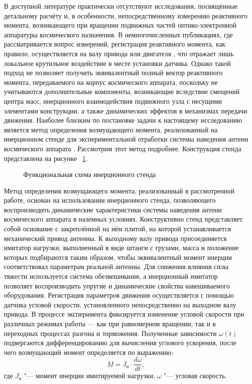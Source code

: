 В доступной литературе практически отсутствуют исследования, посвящённые детальному расчёту и, в особенности, непосредственному измерению реактивного момента, возникающего при вращении подвижных частей оптико-электронной аппаратуры космического назначения. В немногочисленных публикациях, где рассматривается вопрос измерений, регистрация реактивного момента, как правило, осуществляется на валу привода или двигателя \cite{Rayanov2020}, что отражает лишь локальное крутильное воздействие в месте установки датчика. Однако такой подход не позволяет получить эквивалентный полный вектор реактивного момента, передаваемого на корпус космического аппарата, поскольку не учитываются дополнительные компоненты, возникающие вследствие смещений центра масс, инерционного взаимодействия подвижного узла с несущими элементами конструкции, а также динамических эффектов в механизмах передачи движения. Наиболее близким по постановке задачи к настоящему исследованию является метод определения возмущающего момента, реализованный на инерционном стенде для экспериментальной отработки системы наведения антенн космического аппарата \cite{Goncharuk2013}. Рассмотрим этот метод подробнее. Конструкция стенда представлена на рисунке ~\cref{fig:stand}.
\begin{figure}[ht] 
	\caption{Функциональная схема инерционного стенда}
	\label{fig:stand} 
\end{figure}

Метод определения возмущающего момента, реализованный в рассмотренной работе, %
основан на использовании инерционного стенда, позволяющего воспроизводить динамические характеристики системы наведения антенн космического аппарата в наземных условиях. Конструктивно стенд представляет собой основание с закреплённой на нём плитой, на которой устанавливается механический привод антенны. К выходному валу привода присоединяется имитатор нагрузки, выполненный в виде штанги с грузами, масса и положение которых подбираются таким образом, чтобы эквивалентный момент инерции соответствовал параметрам реальной антенны. Для снижения влияния силы тяжести используется система обезвешивания, а инерционный имитатор позволяет воспроизводить упругие и динамические свойства навешиваемого оборудования. Регистрация параметров движения осуществляется с помощью датчика угловой скорости, установленного непосредственно на выходном валу привода. В процессе эксперимента фиксируется изменение угловой скорости при различных режимах работы — как при равномерном вращении, так и в переходных процессах разгона и торможения. Полученные зависимости $\omega(t)$ подвергаются дифференцированию для вычисления углового ускорения, после чего возмущающий момент определяется по выражению:
\begin{equation}
	\label{eq:eq_M_disturb}
	M=J_{\text{н}}\cdot \frac{d\omega}{dt},
\end{equation}
где \(J_{\text{н}}\) "--- момент инерции имитируемой нагрузки, \(\omega\) "--- угловая скорость.

